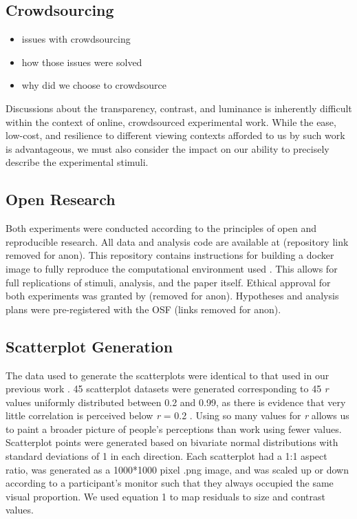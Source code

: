 \documentclass[manuscript, review, anonymous, screen]{acmart}
\providecommand{\tightlist}{%
  \setlength{\itemsep}{0pt}\setlength{\parskip}{0pt}}\usepackage{longtable,booktabs,array}
\begin{document}
\hypertarget{crowdsourcing}{%
\subsection{Crowdsourcing}\label{crowdsourcing}}

\begin{itemize}
\tightlist
\item
  issues with crowdsourcing
\item
  how those issues were solved
\item
  why did we choose to crowdsource
\end{itemize}

Discussions about the transparency, contrast, and luminance is
inherently difficult within the context of online, crowdsourced
experimental work. While the ease, low-cost, and resilience to different
viewing contexts afforded to us by such work is advantageous, we must
also consider the impact on our ability to precisely describe the
experimental stimuli.

\hypertarget{sec-open-research}{%
\subsection{Open Research}\label{sec-open-research}}

Both experiments were conducted according to the principles of open and
reproducible research. All data and analysis code are available at
(repository link removed for anon). This repository contains
instructions for building a docker image to fully reproduce the
computational environment used . This allows for full replications of
stimuli, analysis, and the paper itself. Ethical approval for both
experiments was granted by (removed for anon). Hypotheses and analysis
plans were pre-registered with the OSF (links removed for anon).

\hypertarget{sec-scatter-gen}{%
\subsection{Scatterplot Generation}\label{sec-scatter-gen}}

The data used to generate the scatterplots were identical to that used
in our previous work \citep{strain_2023, strain_2023b}. 45 scatterplot
datasets were generated corresponding to 45 \emph{r} values uniformly
distributed between 0.2 and 0.99, as there is evidence that very little
correlation is perceived below \emph{r} = 0.2
\citep{strahan_1978, bobko_1979, cleveland_1982}. Using so many values
for \emph{r} allows us to paint a broader picture of people's
perceptions than work using fewer values. Scatterplot points were
generated based on bivariate normal distributions with standard
deviations of 1 in each direction. Each scatterplot had a 1:1 aspect
ratio, was generated as a 1000*1000 pixel .png image, and was scaled up
or down according to a participant's monitor such that they always
occupied the same visual proportion. We used equation 1 to map residuals
to size and contrast values.
\end{document}
